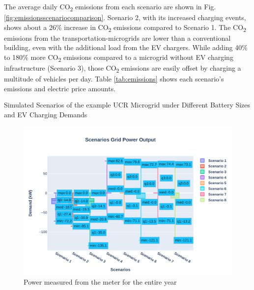 \documentclass[conference]{IEEEtran}
\begin{document}
	
	The average daily CO\textsubscript{2} emissions from each scenario are shown in Fig. \ref{fig:emissionsscenariocomparison}. Scenario 2, with its increased charging events, shows about a 26\% increase in CO\textsubscript{2} emissions compared to Scenario 1. The CO\textsubscript{2} emissions from the transportation-microgrids are lower than a conventional building, even with the additional load from the EV chargers. While adding 40\% to 180\% more CO\textsubscript{2} emissions compared to a microgrid without EV charging infrastructure (Scenario 3), those CO\textsubscript{2} emissions are easily offset by charging a multitude of vehicles per day. Table \ref{tab:emissions} shows each scenario's emissions and electric price amounts.
	\begin{table}
		\caption{Simulated Scenarios of the example UCR Microgrid under Different Battery Sizes and EV Charging Demands}
		
		\normalsize
		\label{tab:scenarios}
	\end{table}
	\begin{figure}
		\centering
		\includegraphics[width=0.9\linewidth]{Fig/Option_3/scenarios_power_output_boxplot}
		\caption{Power measured from the meter for the entire year}
		\label{fig:scenariospoweroutputboxplot}
	\end{figure}
\end{document}
